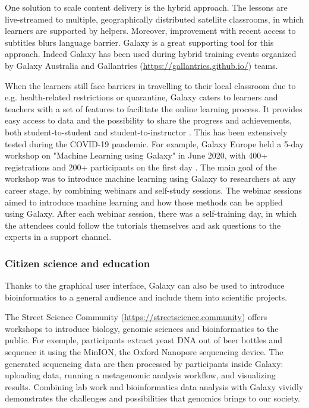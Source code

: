 \documentclass[10pt,letterpaper]{article}
\begin{document}
One solution to scale content delivery is the hybrid approach. The lessons are live-streamed to multiple, geographically distributed satellite classrooms, in which learners are supported by helpers. Moreover, improvement with recent access to subtitles blurs language barrier. Galaxy is a great supporting tool for this approach. Indeed Galaxy has been used during hybrid training events organized by Galaxy Australia \cite{Hall2021} and Gallantries (\url{https://gallantries.github.io/}) teams.

When the learners still face barriers in travelling to their local classroom due to e.g. health-related restrictions or quarantine, Galaxy caters to learners and teachers with a set of features to facilitate the online learning process. It provides easy access to data and the possibility to share the progress and achievements, both student-to-student and student-to-instructor \cite{SerranoSolano2020}. This has been extensively tested during the COVID-19 pandemic. For example, Galaxy Europe held a 5-day workshop on "Machine Learning using Galaxy" in June 2020, with 400+ registrations and 200+ participants on the first day \cite{FreiburgGalaxyTeam2020}. The main goal of the workshop was to introduce machine learning using Galaxy to researchers at any career stage, by combining webinars and self-study sessions. The webinar sessions aimed to introduce machine learning and how those methods can be applied using Galaxy. After each webinar session, there was a self-training day, in which the attendees could follow the tutorials themselves and ask questions to the experts in a support channel.

\subsubsection*{Citizen science and education}

Thanks to the graphical user interface, Galaxy can also be used to introduce bioinformatics to a general audience and include them into scientific projects.

The Street Science Community (\url{https://streetscience.community}) offers workshops to introduce biology, genomic sciences and bioinformatics to the public. For exemple, participants extract yeast DNA out of beer bottles and sequence it using the MinION, the Oxford Nanopore sequencing device. The generated sequencing data are then processed by participants inside Galaxy: uploading data, running a metagenomic analysis workflow, and visualizing results. Combining lab work and bioinformatics data analysis with Galaxy vividly demonstrates the challenges and possibilities that genomics brings to our society.
\end{document}
